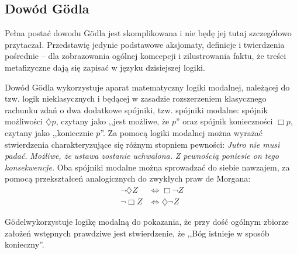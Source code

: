 \documentclass[12pt]{article}
\begin{document}
\begin{multicols}{2}
\section{Dowód G\"odla}
Pełna postać dowodu G\"odla jest skomplikowana i nie będę jej tutaj szczegółowo przytaczał. Przedstawię jedynie podstawowe aksjomaty, definicje i twierdzenia pośrednie -- dla zobrazowania ogólnej komcepcji i zilustrowania faktu, że treści metafizyczne dają się zapisać w języku dzisiejszej logiki. 

Dowód G\"odla wykorzystuje aparat matematyczny logiki modalnej, należącej do tzw. logik nieklasycznych i będącej w zasadzie rozszerzeniem klasycznego rachunku zdań o dwa dodatkowe spójniki, tzw. spójniki modalne: spójnik możliwości $\diamondsuit p$, czytany jako ,,jest możliwe, że $p$'' oraz spójnik konieczności $\Box p$, czytany jako ,,koniecznie $p$''. Za pomocą logiki modalnej można wyrażać stwierdzenia charakteryzujące się różnym stopniem pewności: \emph{Jutro nie musi padać.} \emph{Możliwe, że ustawa zostanie uchwalona.} \emph{Z pewnością poniesie on tego konsekwencje. } Oba spójniki modalne można sprowadzać do siebie nawzajem, za pomocą przekształceń analogicznych do zwykłych praw de Morgana:
\begin{align*}
\neg \diamondsuit Z & \Leftrightarrow \Box \neg Z \\ 
\neg \Box Z & \Leftrightarrow \diamondsuit \neg Z
\end{align*}
		
G\"odelwykorzystuje logikę modalną do pokazania, że przy dość ogólnym zbiorze założeń wstępnych prawdziwe jest stwierdzenie, że ,,Bóg istnieje w sposób konieczny''. 


\end{multicols}
\end{document}
